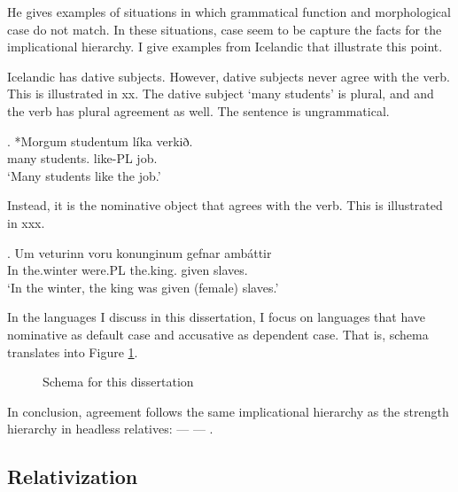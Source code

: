 He gives examples of situations in which grammatical function and morphological case do not match. In these situations, case seem to be capture the facts for the implicational hierarchy. I give examples from Icelandic that illustrate this point.

Icelandic has dative subjects. However, dative subjects never agree with the verb. This is illustrated in xx. The dative subject `many students' is plural, and and the verb has plural agreement as well. The sentence is ungrammatical.

\exg. *Morgum studentum líka verkið.\\
 many students. like-PL job. \\
`Many students like the job.' 

Instead, it is the nominative object that agrees with the verb. This is illustrated in xxx.

\exg. Um veturinn voru konunginum gefnar ambáttir\\
In the.winter were.PL the.king. given slaves.\\
`In the winter, the king was given (female) slaves.' 

In the languages I discuss in this dissertation, I focus on languages that have nominative as default case and accusative as dependent case. That is,  schema translates into Figure \ref{fig:agr-nom-acc-dat}.

\begin{figure}[H]
  \centering
  \label{fig:agr-nom-acc-dat}
  \caption{Schema for this dissertation}
\end{figure}

In conclusion, agreement follows the same implicational hierarchy as the strength hierarchy in headless relatives:  ---  --- .


\subsection{Relativization}


